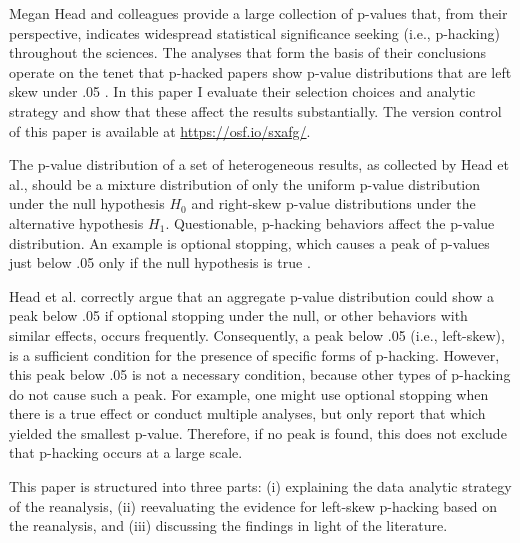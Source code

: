 Megan Head and colleagues \cite{Head_2015} provide a large collection of p-values that, from their perspective, indicates widespread statistical significance seeking (i.e., p-hacking) throughout the sciences. The analyses that form the basis of their conclusions operate on the tenet that p-hacked papers show p-value distributions that are left skew under .05 \cite{Simonsohn2014}. In this paper I evaluate their selection choices and analytic strategy and show that these affect the results substantially. The version control of this paper is available at \href{https://osf.io/sxafg/}{https://osf.io/sxafg/}.

The p-value distribution of a set of heterogeneous results, as collected by Head et al., should be a mixture distribution of only the uniform p-value distribution under the null hypothesis $H_0$ and right-skew p-value distributions under the alternative hypothesis $H_1$. Questionable, p-hacking behaviors affect the p-value distribution. An example is optional stopping, which causes a peak of p-values just below .05 only if the null hypothesis is true \cite{Lakens_2014}.

Head et al. correctly argue that an aggregate p-value distribution could show a peak below .05 if optional stopping under the null, or other behaviors with similar effects, occurs frequently. Consequently, a peak below .05 (i.e., left-skew), is a sufficient condition for the presence of specific forms of p-hacking. However, this peak below .05 is not a necessary condition, because other types of p-hacking do not cause such a peak. For example, one might use optional stopping when there is a true effect \cite{Lakens_2014} or conduct multiple analyses, but only report that which yielded the smallest p-value. Therefore, if no peak is found, this does not exclude that p-hacking occurs at a large scale.  

This paper is structured into three parts: (i) explaining the data analytic strategy of the reanalysis, (ii) reevaluating the evidence for left-skew p-hacking based on the reanalysis, and (iii) discussing the findings in light of the literature.
  
  
